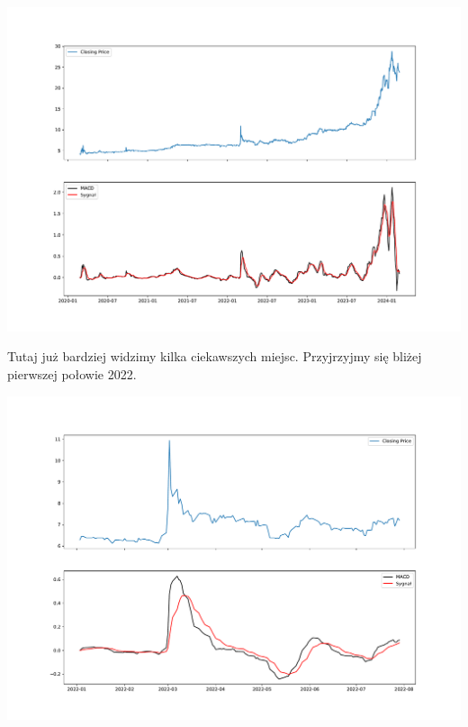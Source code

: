 \documentclass[
]{article}
\begin{document}
\includegraphics{macd_files/figure-latex/unnamed-chunk-2-1.pdf}

Tutaj już bardziej widzimy kilka ciekawszych miejsc. Przyjrzyjmy się
bliżej pierwszej połowie 2022.

\includegraphics{macd_files/figure-latex/unnamed-chunk-3-3.pdf}
\end{document}
